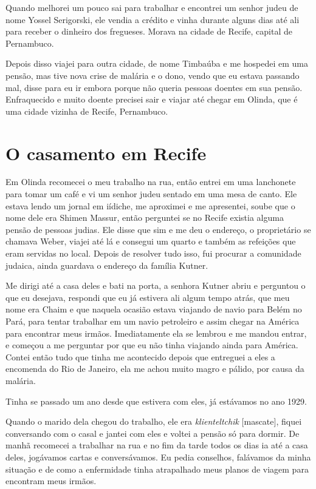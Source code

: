 Quando melhorei um pouco sai para trabalhar e encontrei um senhor judeu
de nome Yossel Serigorski, ele vendia a crédito e vinha durante alguns
dias até ali para receber o dinheiro dos fregueses. Morava na cidade de
Recife, capital de Pernambuco.

Depois disso viajei para outra cidade, de nome Timbaúba e me hospedei em
uma pensão, mas tive nova crise de malária e o dono, vendo que eu estava
passando mal, disse para eu ir embora porque não queria pessoas doentes
em sua pensão. Enfraquecido e muito doente precisei sair e viajar até
chegar em Olinda, que é uma cidade vizinha de Recife, Pernambuco.

\chapter{O casamento em Recife}

Em Olinda recomecei o meu trabalho na rua, então entrei em uma
lanchonete para tomar um café e vi um senhor judeu sentado em uma mesa
de canto. Ele estava lendo um jornal em iídiche, me aproximei e me
apresentei, soube que o nome dele era Shimen Massur, então perguntei se
no Recife existia alguma pensão de pessoas judias. Ele disse que sim e
me deu o endereço, o proprietário se chamava Weber, viajei até lá e
consegui um quarto e também as refeições que eram servidas no local.
Depois de resolver tudo isso, fui procurar a comunidade judaica, ainda
guardava o endereço da família Kutner.

Me dirigi até a casa deles e bati na porta, a senhora Kutner abriu e
perguntou o que eu desejava, respondi que eu já estivera ali algum tempo
atrás, que meu nome era Chaim e que naquela ocasião estava viajando de
navio para Belém no Pará, para tentar trabalhar em um navio petroleiro e
assim chegar na América para encontrar meus irmãos. Imediatamente ela se
lembrou e me mandou entrar, e começou a me perguntar por que eu não
tinha viajando ainda para América. Contei então tudo que tinha me
acontecido depois que entreguei a eles a encomenda do Rio de Janeiro,
ela me achou muito magro e pálido, por causa da malária.

Tinha se passado um ano desde que estivera com eles, já estávamos no ano
1929.

Quando o marido dela chegou do trabalho, ele era \textit{klienteltchik} [mascate], 
fiquei conversando com o casal e jantei com eles e
voltei a pensão só para dormir. De manhã recomecei a trabalhar na rua e
no fim da tarde todos os dias ia até a casa deles, jogávamos cartas e
conversávamos. Eu pedia conselhos, falávamos da minha situação e de como
a enfermidade tinha atrapalhado meus planos de viagem para encontram
meus irmãos.

